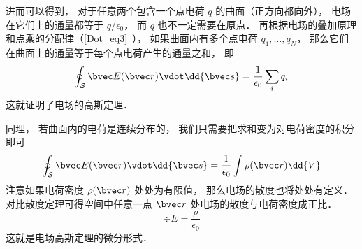 进而可以得到， 对于任意两个包含一个点电荷 $q$ 的曲面（正方向都向外）， 电场在它们上的通量都等于 $q/\epsilon_0$， 而 $q$ 也不一定需要在原点． 再根据电场的叠加原理和点乘的分配律（\autoref{Dot_eq3}~）， 如果曲面内有多个点电荷 $q_1, \dots, q_N$， 那么它们在曲面上的通量等于每个点电荷产生的通量之和， 即
\begin{equation}
\oint_{\mathcal S} \bvec E(\bvec r) \vdot \dd{\bvec s} = \frac{1}{\epsilon_0} \sum_i q_i
\end{equation}
这就证明了电场的高斯定理．

同理， 若曲面内的电荷是连续分布的， 我们只需要把求和变为对电荷密度的积分即可
\begin{equation}
\oint_{\mathcal S} \bvec E(\bvec r) \vdot \dd{\bvec s} = \frac{1}{\epsilon_0} \int \rho(\bvec r) \dd{V}
\end{equation}
注意如果电荷密度 $\rho(\bvec r)$ 处处为有限值， 那么电场的散度也将处处有定义． 对比散度定理可得空间中任意一点 $\bvec r$ 处电场的散度与电荷密度成正比．
\begin{equation}
\div E = \frac{\rho}{\epsilon_0}
\end{equation}
这就是电场高斯定理的微分形式．
